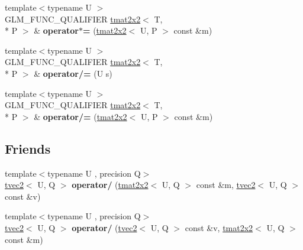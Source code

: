 \begin{DoxyCompactItemize}
\item 
\hypertarget{structglm_1_1tmat2x2_ae5777c0b61d77643916a6228c1bad207}{{\footnotesize template$<$typename U $>$ }\\G\-L\-M\-\_\-\-F\-U\-N\-C\-\_\-\-Q\-U\-A\-L\-I\-F\-I\-E\-R \hyperlink{structglm_1_1tmat2x2}{tmat2x2}$<$ T, \\*
P $>$ \& {\bfseries operator$\ast$=} (\hyperlink{structglm_1_1tmat2x2}{tmat2x2}$<$ U, P $>$ const \&m)}\label{structglm_1_1tmat2x2_ae5777c0b61d77643916a6228c1bad207}

\item 
\hypertarget{structglm_1_1tmat2x2_a53f758e76e82f490fbe6100f7750ff50}{{\footnotesize template$<$typename U $>$ }\\G\-L\-M\-\_\-\-F\-U\-N\-C\-\_\-\-Q\-U\-A\-L\-I\-F\-I\-E\-R \hyperlink{structglm_1_1tmat2x2}{tmat2x2}$<$ T, \\*
P $>$ \& {\bfseries operator/=} (U s)}\label{structglm_1_1tmat2x2_a53f758e76e82f490fbe6100f7750ff50}

\item 
\hypertarget{structglm_1_1tmat2x2_a3d12dbc4378d84707572ab61ae1b1b30}{{\footnotesize template$<$typename U $>$ }\\G\-L\-M\-\_\-\-F\-U\-N\-C\-\_\-\-Q\-U\-A\-L\-I\-F\-I\-E\-R \hyperlink{structglm_1_1tmat2x2}{tmat2x2}$<$ T, \\*
P $>$ \& {\bfseries operator/=} (\hyperlink{structglm_1_1tmat2x2}{tmat2x2}$<$ U, P $>$ const \&m)}\label{structglm_1_1tmat2x2_a3d12dbc4378d84707572ab61ae1b1b30}

\end{DoxyCompactItemize}
\subsection*{Friends}
\begin{DoxyCompactItemize}
\item 
\hypertarget{structglm_1_1tmat2x2_a6d8b6618f8e231cea3dec1d6b21d7de3}{{\footnotesize template$<$typename U , precision Q$>$ }\\\hyperlink{structglm_1_1tvec2}{tvec2}$<$ U, Q $>$ {\bfseries operator/} (\hyperlink{structglm_1_1tmat2x2}{tmat2x2}$<$ U, Q $>$ const \&m, \hyperlink{structglm_1_1tvec2}{tvec2}$<$ U, Q $>$ const \&v)}\label{structglm_1_1tmat2x2_a6d8b6618f8e231cea3dec1d6b21d7de3}

\item 
\hypertarget{structglm_1_1tmat2x2_af5138f235b2448c769a37e7d222a5ab6}{{\footnotesize template$<$typename U , precision Q$>$ }\\\hyperlink{structglm_1_1tvec2}{tvec2}$<$ U, Q $>$ {\bfseries operator/} (\hyperlink{structglm_1_1tvec2}{tvec2}$<$ U, Q $>$ const \&v, \hyperlink{structglm_1_1tmat2x2}{tmat2x2}$<$ U, Q $>$ const \&m)}\label{structglm_1_1tmat2x2_af5138f235b2448c769a37e7d222a5ab6}

\end{DoxyCompactItemize}



